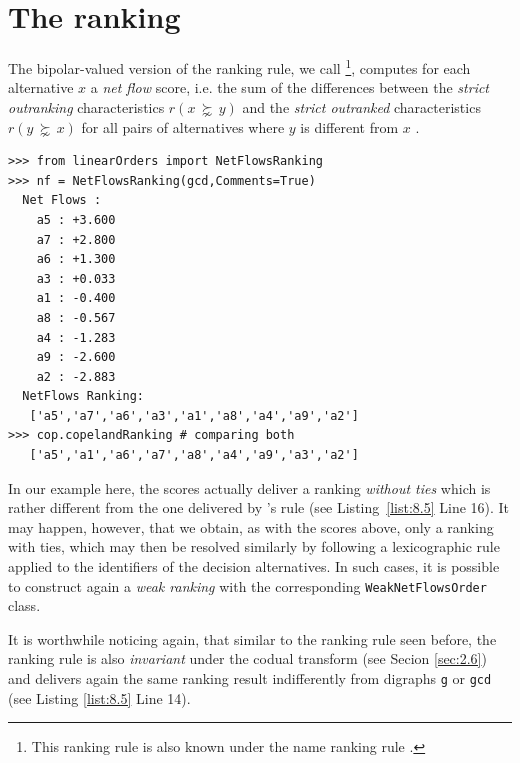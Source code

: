\section{The \NetFlows ranking}
\label{sec:8.3}

\begin{definition}\label{def:netflows} The bipolar-valued version of the \Copeland ranking rule, we call \NetFlows \footnote{This ranking rule is also known under the name \Promethee ranking rule \citep*{BRA-1985}.}, computes for each alternative $x$ a \emph{net flow} score,  i.e. the sum of the differences between the \emph{strict outranking} characteristics $r(x\, \succnsim \,y)$ and the \emph{strict outranked} characteristics $r(y\, \succnsim \,x)$ for all pairs of alternatives where $y$ is different from $x$ .
\end{definition}
\begin{lstlisting}[caption={Computing a \NetFlows ranking},label=list:8.5]
>>> from linearOrders import NetFlowsRanking
>>> nf = NetFlowsRanking(gcd,Comments=True)
  Net Flows :
    a5 : +3.600
    a7 : +2.800
    a6 : +1.300
    a3 : +0.033
    a1 : -0.400
    a8 : -0.567
    a4 : -1.283
    a9 : -2.600
    a2 : -2.883
  NetFlows Ranking:
   ['a5','a7','a6','a3','a1','a8','a4','a9','a2']
>>> cop.copelandRanking # comparing both
   ['a5','a1','a6','a7','a8','a4','a9','a3','a2']
\end{lstlisting}
In our example here, the \NetFlows scores actually deliver a ranking \emph{without ties} which is rather different from the one delivered by \Copeland 's rule (see Listing~\ref{list:8.5} Line 16). It may happen, however, that we obtain, as with the \Copeland scores above, only a ranking with ties, which may then be resolved similarly by following a lexicographic rule applied to the identifiers of the decision alternatives. In such cases, it is possible to construct again a \emph{weak ranking} with the corresponding \texttt{WeakNetFlowsOrder} class.

It is worthwhile noticing again, that similar to the \Copeland ranking rule seen before, the \NetFlows ranking rule is also \emph{invariant} under the codual transform (see Secion \ref{sec:2.6}) and delivers again the same ranking result indifferently from digraphs \texttt{g} or \texttt{gcd} (see Listing \ref{list:8.5} Line 14). 

